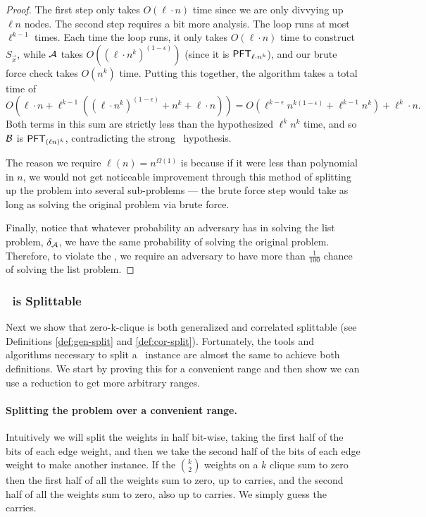 \begin{proof}
	The first step only takes $O(\ell \cdot n)$ time since we are only divvying up $\ell n$ nodes. The second step requires a bit more analysis. The loop runs at most $\ell^{k-1}$ times. Each time the loop runs, it only takes $O(\ell \cdot n)$ time to construct $S_{\vec x}$, while $\mathcal{A}$ takes $O((\ell \cdot n^{k})^{(1-\epsilon)})$ (since it is $\mathsf{PFT}_{\ell \cdot n^k}$), and our brute force check takes $O(n^k)$ time. Putting this together, the algorithm takes a total time of 
	\[O(\ell \cdot n + \ell^{k-1} ((\ell \cdot n^{k})^{(1-\epsilon)} + n^k + \ell \cdot n) ) = O(\ell^{k-\epsilon}n^{k(1-\epsilon)} + \ell^{k-1}n^{k}) + \ell^k \cdot n.\]
	Both terms in this sum are strictly less than the hypothesized $\ell^k n^k$ time, and so ${\cal B}$ is $\mathsf{PFT}_{(\ell n)^k}$, contradicting the strong \zkclique~hypothesis.
	
	The reason we require $\ell(n) = n^{\Omega(1)}$ is because if it were less than polynomial in $n$, we would not get noticeable improvement through this method of splitting up the problem into several sub-problems --- the brute force step would take as long as solving the original problem via brute force.
	
	Finally, notice that whatever probability an adversary has in solving the list problem, $\delta_{\mathcal{A}}$, we have the same probability of solving the original problem. Therefore, to violate the \strongzkc, we require an adversary to have more than $\frac 1 {100}$ chance of solving the list problem.
\end{proof}


\subsubsection{\zkclique~is Splittable}\label{sec:zkcsplittable}
Next we show that zero-k-clique is both generalized and correlated splittable (see Definitions \ref{def:gen-split} and \ref{def:cor-split}). Fortunately, the tools and algorithms necessary to split a \zkclique~instance are almost the same to achieve both definitions. We start by proving this for a convenient range and then show we can use a reduction to get more arbitrary ranges. 

\paragraph{Splitting the problem over a convenient range.} Intuitively we will split the weights in half bit-wise, taking the first half of the bits of each edge weight, and then we take the second half of the bits of each edge weight to make another instance. If the $\binom{k}{2}$ weights on a $k$ clique sum to zero then the first half of all the weights sum to zero, up to carries, and the second half of all the weights sum to zero, also up to carries. We simply guess the carries. 

